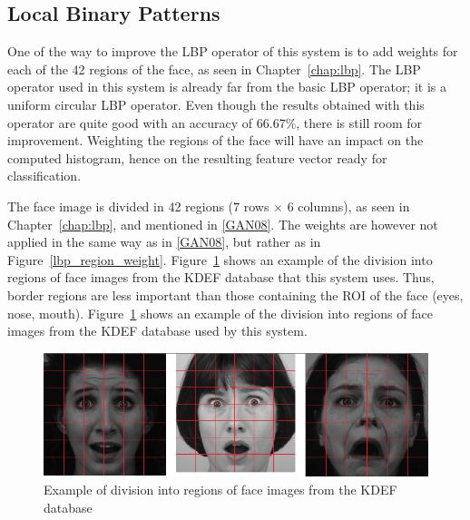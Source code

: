 \subsection{Local Binary Patterns}

\vspace{\baselineskip}
\noindent One of the way to improve the LBP operator of this system is to add weights for each of the 42 regions of the face, as seen in Chapter~\ref{chap:lbp}. The LBP operator used in this system is already far from the basic LBP operator; it is a uniform circular LBP operator. Even though the results obtained with this operator are quite good with an accuracy of $ 66.67\% $, there is still room for improvement. Weighting the regions of the face will have an impact on the computed histogram, hence on the resulting feature vector ready for classification. \newline

\noindent The face image is divided in 42 regions ($ 7 $ rows $\times$ $ 6 $ columns), as seen in Chapter~\ref{chap:lbp}, and mentioned in \ref{GAN08}. The weights are however not applied in the same way as in \ref{GAN08}, but rather as in Figure~\ref{lbp_region_weight}. Figure~\ref{implementation_weight_example} shows an example of the division into regions of face images from the KDEF database that this system uses. Thus, border regions are less important than those containing the ROI of the face (eyes, nose, mouth). Figure~\ref{implementation_weight_example} shows an example of the division into regions of face images from the KDEF database used by this system.
\newline

\begin{figure}[!h]
\begin{center}
\noindent \includegraphics[scale=0.3]{figures/implementation_weight_example} 
\newline
\caption{Example of division into regions of face images from the KDEF database}
\label{implementation_weight_example}
\end{center} 
\end{figure}

